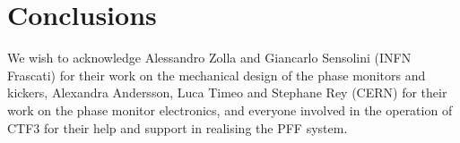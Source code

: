 \documentclass[%
 reprint,
 superscriptaddress,
 amsmath,
 amssymb,
 prstab,
]{revtex4-1}
\begin{document}
\section{\label{s:conc}Conclusions}

\begin{acknowledgments}
	We wish to acknowledge Alessandro Zolla and Giancarlo Sensolini (INFN 
	Frascati) for their work on the mechanical design of the phase monitors and 
	kickers, 
	Alexandra Andersson, Luca Timeo and Stephane Rey (CERN) for their work on 
	the phase monitor electronics, and everyone involved in the operation of 
	CTF3 for their help and support in realising the PFF system.
\end{acknowledgments}


\end{document}
